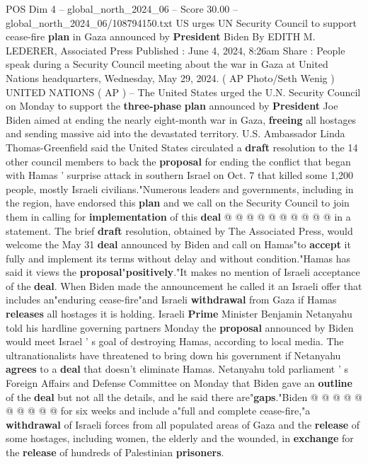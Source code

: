\begin{textsample}{POS Dim 4 – global\_north\_2024\_06 – Score 30.00 – global\_north\_2024\_06/108794150.txt}  \label{ex:f4_pos_131}
US urges UN Security Council to support cease-fire \textbf{plan} in Gaza announced by \textbf{President} Biden By EDITH M.
LEDERER, Associated Press Published : June 4, 2024, 8:26am Share : People speak during a Security Council meeting about the war in Gaza at United Nations headquarters, Wednesday, May 29, 2024. ( AP Photo/Seth Wenig ) UNITED NATIONS ( AP ) -- The United States urged the U.N.
Security Council on Monday to support the \textbf{three-phase} \textbf{plan} announced by \textbf{President} Joe Biden aimed at ending the nearly eight-month war in Gaza, \textbf{freeing} all hostages and sending massive aid into the devastated territory.
U.S.
Ambassador Linda Thomas-Greenfield said the United States circulated a \textbf{draft} resolution to the 14 other council members to back the \textbf{proposal} for ending the conflict that began with Hamas ' surprise attack in southern Israel on Oct. 7 that killed some 1,200 people, mostly Israeli civilians."Numerous leaders and governments, including in the region, have endorsed this \textbf{plan} and we call on the Security Council to join them in calling for \textbf{implementation} of this \textbf{deal} @ @ @ @ @ @ @ @ @ @ in a statement.
The brief \textbf{draft} resolution, obtained by The Associated Press, would welcome the May 31 \textbf{deal} announced by Biden and call on Hamas"to \textbf{accept} it fully and implement its terms without delay and without condition."Hamas has said it views the \textbf{proposal}"\textbf{positively}."It makes no mention of Israeli acceptance of the \textbf{deal}.
When Biden made the announcement he called it an Israeli offer that includes an"enduring cease-fire"and Israeli \textbf{withdrawal} from Gaza if Hamas \textbf{releases} all hostages it is holding.
Israeli \textbf{Prime} Minister Benjamin Netanyahu told his hardline governing partners Monday the \textbf{proposal} announced by Biden would meet Israel ' s goal of destroying Hamas, according to local media.
The ultranationalists have threatened to bring down his government if Netanyahu \textbf{agrees} to a \textbf{deal} that doesn't eliminate Hamas.
Netanyahu told parliament ' s Foreign Affairs and Defense Committee on Monday that Biden gave an \textbf{outline} of the \textbf{deal} but not all the details, and he said there are"\textbf{gaps}."Biden @ @ @ @ @ @ @ @ @ @ for six weeks and include a"full and complete cease-fire,"a \textbf{withdrawal} of Israeli forces from all populated areas of Gaza and the \textbf{release} of some hostages, including women, the elderly and the wounded, in \textbf{exchange} for the \textbf{release} of hundreds of Palestinian \textbf{prisoners}.

\end{textsample}
